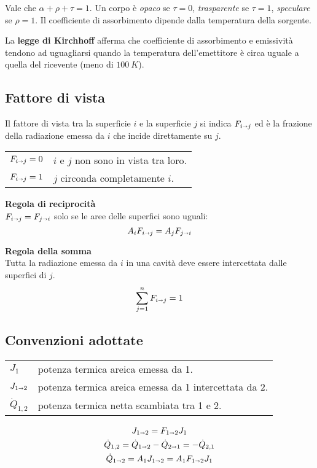 Vale che $\alpha + \rho + \tau = 1$. Un corpo è \emph{opaco} se $\tau = 0$, \emph{trasparente} se $\tau = 1$, \emph{speculare} se $\rho = 1$.
Il coefficiente di assorbimento dipende dalla temperatura della sorgente.

La \textbf{legge di Kirchhoff} afferma che coefficiente di assorbimento e emissività tendono ad uguagliarsi quando la temperatura dell'emettitore è circa uguale a quella del ricevente (meno di $\SI{100}{K}$).

\subsection{Fattore di vista}

Il fattore di vista tra la superficie $i$ e la superficie $j$ si indica $F_{i\shortrightarrow j}$ ed è la frazione della radiazione emessa da $i$ che incide direttamente su $j$.

\begin{tabular}{ll}
    $F_{i\shortrightarrow j} = 0$ & $i$ e $j$ non sono in vista tra loro. \\
    $F_{i\shortrightarrow j} = 1$ & $j$ circonda completamente $i$.
\end{tabular}

\textbf{Regola di reciprocità}\\
$F_{i\shortrightarrow j} = F_{j\shortrightarrow i}$ solo se le aree delle superfici sono uguali:
\[
    A_iF_{i\shortrightarrow j} = A_jF_{j\shortrightarrow i}
\]

\textbf{Regola della somma}\\
Tutta la radiazione emessa da $i$ in una cavità deve essere intercettata dalle superfici di $j$.
\[
    \sum_{j=1}^n F_{i\shortrightarrow j} = 1
\]


\subsection{Convenzioni adottate}

\begin{tabular}{ll}
    $J_1$ & potenza termica areica emessa da 1. \\
    $J_{1\shortrightarrow 2}$ & potenza termica areica emessa da 1 intercettata da 2. \\
    $\dot{Q}_{1,2}$ & potenza termica netta scambiata tra 1 e 2. \\
\end{tabular}

\begin{equation*}
    \begin{gathered}
        J_{1\shortrightarrow 2} = F_{1\shortrightarrow 2}J_1 \\
        \dot{Q}_{1,2} = \dot{Q}_{1\shortrightarrow 2} - \dot{Q}_{2\shortrightarrow 1} = -\dot{Q}_{2,1} \\
        \dot{Q}_{1\shortrightarrow 2} = A_1J_{1\shortrightarrow 2} = A_1F_{1\shortrightarrow 2}J_1
    \end{gathered}
\end{equation*}

